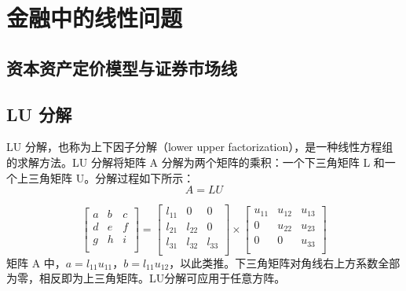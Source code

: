 \chapter{金融中的线性问题}
\section{资本资产定价模型与证券市场线}
\section{LU 分解}
LU 分解，也称为上下因子分解（lower upper factorization），是一种线性方程组的求解方法。LU 分解将矩阵 A 分解为两个矩阵的乘积：一个下三角矩阵 L 和一个上三角矩阵 U。分解过程如下所示：
$$A=LU$$

\begin{equation}
    \begin{bmatrix}
        a & b & c \\
        d & e & f \\
        g & h & i \\
    \end{bmatrix}=
    \begin{bmatrix}
        l_{11} & 0      & 0      \\
        l_{21} & l_{22} & 0      \\
        l_{31} & l_{32} & l_{33} \\
    \end{bmatrix}
    \times
    \begin{bmatrix}
        u_{11} & u_{12} & u_{13} \\
        0      & u_{22} & u_{23} \\
        0      & 0      & u_{33} \\
    \end{bmatrix}
\end{equation}
矩阵 A 中，$a = l_{11}u_{11}$，$b = l_{11}u_{12}$，以此类推。下三角矩阵对角线右上方系数全部为零，相反即为上三角矩阵。LU分解可应用于任意方阵。